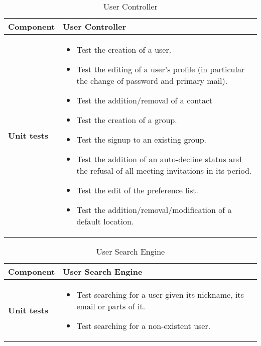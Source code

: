 \begin{table}[h]	
	\centering
	\def\arraystretch{1.5}
	\begin{tabular}{|m{4cm}|m{12cm}|}
		\hline
		\textbf{Component} & User Controller \\ \hline
		\textbf{Unit tests} & 
			\begin{itemize}
			\item Test the creation of a user.
			\item Test the editing of a user's profile (in particular the change of password and primary mail).
			\item Test the addition/removal of a contact
			\item Test the creation of a group.
			\item Test the signup to an existing group.
			\item Test the addition of an auto-decline status and the refusal of all meeting invitations in its period.
			\item Test the edit of the preference list.
			\item Test the addition/removal/modification of a default location.
			\end{itemize} \\ \hline
	\end{tabular}
	\caption{User Controller}
\end{table}

\begin{table}[h]	
	\centering
	\def\arraystretch{1.5}
	\begin{tabular}{|m{4cm}|m{12cm}|}
		\hline
		\textbf{Component} & User Search Engine \\ \hline
		\textbf{Unit tests} & 
			\begin{itemize}
			\item Test searching for a user given its nickname, its email or parts of it.
			\item Test searching for a non-existent user.
			\end{itemize} \\ \hline
	\end{tabular}
	\caption{User Search Engine}
\end{table}

